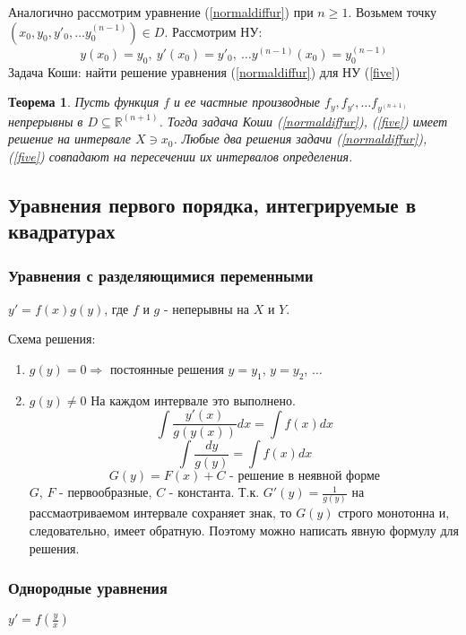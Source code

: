 \documentclass{article}
\newtheorem{teo}{Теорема}
\begin{document}
  Аналогично рассмотрим уравнение (\ref{normaldiffur}) при $n \geqslant 1$.
  Возьмем точку $(x_0, y_0, y'_0, \ldots y_0^{(n-1)}) \in D$. Рассмотрим НУ:
  \begin{equation}
  \label{five}
  y(x_0) = y_0,~ y'(x_0) = y'_0,~ \ldots y^{(n - 1)}(x_0) = y^{(n - 1)}_0
  \end{equation}   
  Задача Коши: найти  решение уравнения (\ref{normaldiffur}) для НУ (\ref{five})
  \begin{teo}
  Пусть функция $f$ и ее частные производные $f_y, f_{y'}, \ldots f_{y^{(n + 1)}} $ непрерывны в $ D \subseteq \mathbb{R}^{(n + 1)}$. Тогда задача Коши (\ref{normaldiffur}), (\ref{five}) имеет решение на интервале $X \ni x_0$. Любые два решения задачи (\ref{normaldiffur}), (\ref{five}) совпадают на пересечении их интервалов определения.
  \end{teo}
  
  \subsection{Уравнения первого порядка, интегрируемые в квадратурах}
  \subsubsection{Уравнения с разделяющимися переменными}
  $\boxed{y' = f(x)g(y) }$, где $f$ и $g$ - неперывны на $X$ и $Y$. 
  
  \noindent Схема решения:
  \begin{enumerate}
  
  \item $g(y) = 0 \Rightarrow$ постоянные решения $y = y_1$, $y = y_2$, $\ldots$
  \item $g(y) \neq 0$ На каждом интервале это выполнено.
  $$ \int \frac{y'(x)}{g(y(x))}dx = \int f(x)dx $$
  $$ \int \frac{dy}{g(y)} = \int f(x)dx $$
  $$ G(y) = F(x) + C \text{ - решение в неявной форме} $$
  $G$, $F$ - первообразные, $C$ - константа.
  Т.к. $G'(y) = \frac{1}{g(y)}$ на рассмаотриваемом интервале сохраняет знак, то $G(y)$ строго монотонна и, следовательно, имеет обратную. Поэтому можно написать явную формулу для решения.
  \end{enumerate}
  
  \subsubsection{Однородные уравнения}
  $\boxed{ y' = f\left(\frac{y}{x}\right) }$
  
\end{document}
